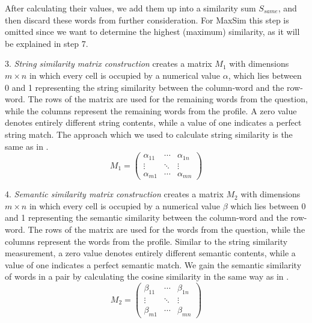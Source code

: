 \documentclass[conference]{IEEEtran}
\begin{document}
\vspace{-0.3cm}
After calculating their values, we add them up into a similarity sum $S_{same}$, and then discard these words from further consideration. For MaxSim this step is omitted since we want to determine the highest (maximum) similarity, as it will be explained in step 7.

3. {\it String similarity matrix construction} creates a matrix $M_1$ with dimensions $m\times n$ in which every cell is occupied by a numerical value $\alpha$, which lies between 0 and 1 representing the string similarity between the column-word and the row-word. The rows of the matrix are used for the remaining words from the question, while the columns represent the remaining words from the profile. A zero value denotes entirely different string contents, while a value of one indicates a perfect string match. The approach which we used to calculate string similarity is the same as in \cite{bib:LinSTSS}.
\begin{equation}
	\label{eq:m1}
	M_1 = 
\left( 
	\begin{array}{ccc}
		\alpha_{11} & \cdots & \alpha_{1n} \\
		\vdots & \ddots & \vdots \\
		\alpha_{m1} & \cdots & \alpha_{mn} 
	\end{array} 
\right)
\end{equation}

4. {\it Semantic similarity matrix construction} creates a matrix $M_2$ with dimensions $m\times n$ in which every cell is occupied by a numerical value $\beta$ which lies between 0 and 1 representing the semantic similarity between the column-word and the row-word. The rows of the matrix are used for the words from the question, while the columns represent the words from the profile. Similar to the string similarity measurement, a zero value denotes entirely different semantic contents, while a value of one indicates a perfect semantic match. We gain the semantic similarity of words in a pair by calculating the cosine similarity in the same way as in \cite{bib:LinSTSS}.
\begin{equation}
	\label{eq:m2}
	M_2 = 
\left( 
	\begin{array}{ccc}
		\beta_{11} & \cdots & \beta_{1n} \\
		\vdots & \ddots & \vdots \\
		\beta_{m1} & \cdots & \beta_{mn} 
	\end{array} 
\right)
\end{equation}
\end{document}
